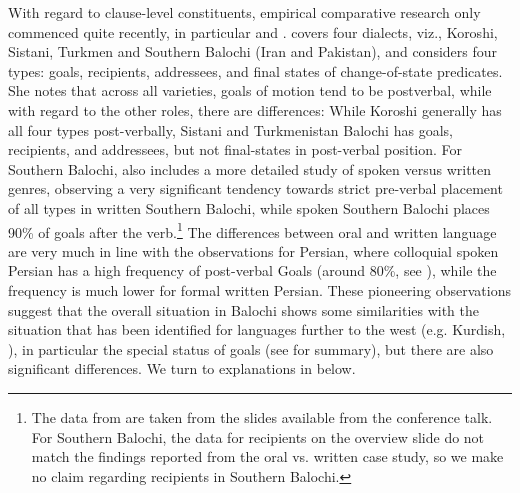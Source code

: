 \documentclass[output=paper,colorlinks,citecolor=brown,draftmode]{langscibook}
\begin{document}
With regard to clause-level constituents, empirical comparative research only commenced quite recently, in particular \citet{Jahani2018Post-verbal} and \citet{Korn2022Targets}. \citet{Jahani2018Post-verbal} covers four dialects, viz., Koroshi, Sistani, Turkmen and Southern Balochi (Iran and Pakistan), and considers four  types: goals, recipients, addressees, and final states of change-of-state predicates. She notes that across all varieties, goals of motion tend to be postverbal, while with regard to the other roles, there are differences: While Koroshi generally has all four  types post-verbally, Sistani and Turkmenistan Balochi has goals, recipients, and addressees, but not final-states in post-verbal position. For Southern Balochi, also \citet{Jahani2018Post-verbal} includes a more detailed study of spoken versus written genres, observing a very significant tendency towards strict pre-verbal placement of all  types in written Southern Balochi, while spoken Southern Balochi places 90\% of goals after the verb.\footnote{
The data from \citet{Jahani2018Post-verbal} are taken from the slides available from the conference talk. For Southern Balochi, the data for recipients on the overview slide do not match the findings reported from the oral vs. written case study, so we make no claim regarding recipients in Southern Balochi.  
} The differences between oral and written language are very much in line with the observations for Persian, where colloquial spoken Persian has a high frequency of post-verbal Goals (around 80\%, see ), while the frequency is much lower for formal written Persian. These pioneering observations suggest that the overall situation in Balochi shows some similarities with the situation that has been identified for languages further to the west (e.g. Kurdish, \citealt{haig_kurdish_2022}), in particular the special status of goals (see  for summary), but there are also significant differences. We turn to explanations in  below.
\end{document}
